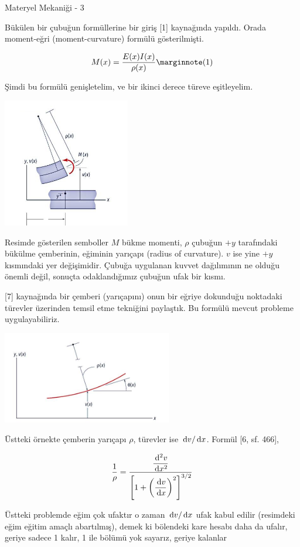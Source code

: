 \documentclass[12pt,fleqn]{article}\usepackage{../../common}
\begin{document}
Materyel Mekaniği - 3

Bükülen bir çubuğun formüllerine bir giriş [1] kaynağında yapıldı. Orada
moment-eğri (moment-curvature) formülü gösterilmişti.

$$
M(x) = \frac{E(x)I(x)}{\rho(x)}
\mlabel{1}
$$

Şimdi bu formülü genişletelim, ve bir ikinci derece türeve eşitleyelim.

\includegraphics[width=15em]{phy_020_strs_05_01.jpg}

Resimde gösterilen semboller $M$ bükme momenti, $\rho$ çubuğun $+y$ tarafındaki
bükülme çemberinin, eğiminin yarıçapı (radius of curvature).  $v$ ise yine $+y$
kısmındaki yer değişimidir. Çubuğa uygulanan kuvvet dağılımının ne olduğu
önemli değil, sonuçta odaklandığımız çubuğun ufak bir kısmı.

[7] kaynağında bir çemberi (yarıçapını) onun bir eğriye dokunduğu noktadaki
türevler üzerinden temsil etme tekniğini paylaştık. Bu formülü mevcut probleme
uygulayabiliriz.

\includegraphics[width=20em]{phy_020_strs_05_02.jpg}

Üstteki örnekte çemberin yarıçapı $\rho$, türevler ise $\,\mathrm{d} v / \,\mathrm{d} x$.
Formül [6, sf. 466],

$$
\frac{1}{\rho} =
\frac
{\dfrac{\,\mathrm{d}^2 v}{\,\mathrm{d} x^2}}
{ \left[ 1 + \left( \dfrac{\,\mathrm{d} v}{\,\mathrm{d} x}  \right)^2 \right]^{3/2} }
$$

Üstteki problemde eğim çok ufaktır o zaman $\,\mathrm{d} v / \,\mathrm{d} x$ ufak kabul edilir
(resimdeki eğim eğitim amaçlı abartılmış), demek ki bölendeki kare hesabı
daha da ufalır, geriye sadece 1 kalır, 1 ile bölümü yok sayarız, geriye kalanlar
\end{document}

